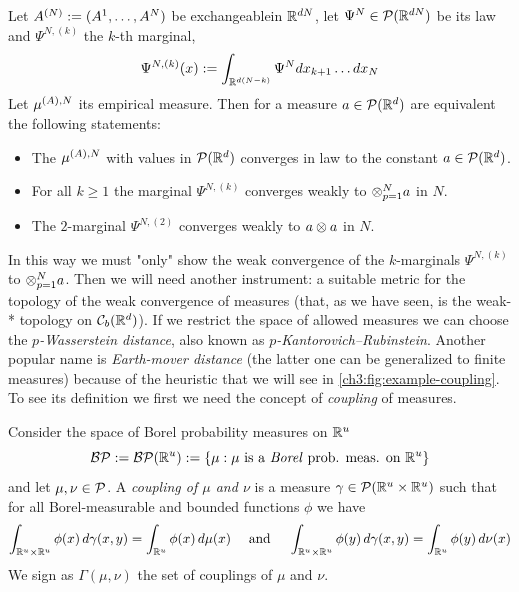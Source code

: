 \begin{proposition}\label{ch3:proposition:sznitman}
	Let $A^{(N)} := (A^1, \ldots, A^N)$ be exchangeable\footnotemark[1] \rv in $\mathbb{R}^{dN}$, let $\Psi^N\in \mathcal{P}(\mathbb{R}^{dN})$ be its law and $\Psi^{N, (k)}$ the $k$-th marginal, \ie
	\begin{equation*}
		\Psi^{N, (k)} (x) := \int_{\mathbb{R}^{d(N-k)}} \Psi^N dx_{k+1} \ldots dx_N
	\end{equation*}
	Let $\mu^{(A),N}$ its empirical measure.
	Then for a measure $a \in \mathcal{P}(\mathbb{R}^d)$ are equivalent the following statements:
	\begin{itemize}
		\item The \rv $\mu^{(A),N}$ with values in $\mathcal{P}(\mathbb{R}^d)$ converges in law to the constant \rv $a \in \mathcal{P}(\mathbb{R}^d)$.
		\item For all $k \geq 1$ the marginal $\Psi^{N, (k)}$ converges weakly to $ \otimes_{p=1}^N a$ in $N$.
		\item The $2$-marginal $\Psi^{N, (2)}$ converges weakly to $ a\otimes a$ in $N$.
	\end{itemize}
\end{proposition}

In this way we must "only" show the weak convergence of the $k$-marginals $\Psi^{N, (k)}$ to $ \otimes_{p=1}^N a$.
Then we will need another instrument: a suitable metric for the topology of the weak convergence of measures (that, as we have seen, is the weak-* topology on $\mathcal{C}_b(\mathbb{R}^d)$). If we restrict the space of allowed measures we can choose the \emph{$p$-Wasserstein distance}, also known as \emph{$p$-Kantorovich–Rubinstein}. Another popular name is \emph{Earth-mover distance} (the latter one can be generalized to finite measures) because of the heuristic that we will see in \ref{ch3:fig:example-coupling}.
To see its definition we first we need the concept of \emph{coupling} of measures.

\begin{definition}
	Consider the space of Borel probability measures on $\mathbb{R}^u$
	\begin{equation}
		\mathcal{BP} := \mathcal{BP} (\mathbb{R}^u) := 
		\{\mu :
		\mu \text{ is a \emph{Borel} prob. meas. on } \mathbb{R}^u
		\}
	\end{equation}
	and let $\mu, \nu \in \mathcal{P}$. A \emph{coupling of $\mu$ and $\nu$} is a measure $\gamma \in \mathcal{P} (\mathbb{R}^u \times \mathbb{R}^u)$ such that for all Borel-measurable and bounded functions $\phi$ we have
	\begin{equation}
		\int_{\mathbb{R}^u \times \mathbb{R}^u} \phi(x) \,d\gamma(x,y) = \int_{\mathbb{R}^u} \phi(x) \,d\mu(x) 
		\quad \text{ and } \quad
		\int_{\mathbb{R}^u \times \mathbb{R}^u} \phi(y) \,d\gamma(x,y) = \int_{\mathbb{R}^u} \phi(y) \,d\nu(x) 
	\end{equation}\label{ch3:def-coupling}
	We sign as $\Gamma(\mu,\nu)$ the set of couplings of $\mu$ and $\nu$.
\end{definition}

